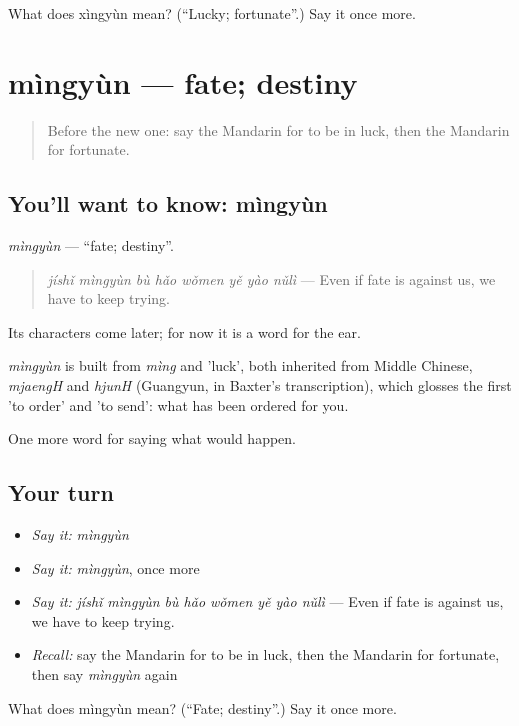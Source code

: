 \begin{tcolorbox}[breakable,colback=teal!4,colframe=teal!35!black,title={Before you move on}]
What does xìngyùn mean? (\textquotedblleft{}Lucky; fortunate\textquotedblright{}.) Say it once more.
\end{tcolorbox}
\section[mìngyùn]{mìngyùn — fate; destiny}

\label{lesson:ZH-C529-mingyun}



\begin{quote}
Before the new one: say the Mandarin for to be in luck, then the Mandarin for fortunate.
\end{quote}

\subsection*{You'll want to know: mìngyùn}
\emph{mìngyùn} — \textquotedblleft{}fate; destiny\textquotedblright{}.

\begin{quote}
\emph{jíshǐ mìngyùn bù hǎo wǒmen yě yào nǔlì} — Even if fate is against us, we have to keep trying.
\end{quote}

Its characters come later; for now it is a word for the ear.

\begin{cousinweb}
\emph{mìngyùn} is built from \emph{mìng} and  'luck', both inherited from Middle Chinese, \emph{mjaengH} and \emph{hjunH} (Guangyun, in Baxter's transcription), which glosses the first 'to order' and 'to send': what has been ordered for you.
\end{cousinweb}

\begin{grammarlens}[title={What you've built}]
One more word for saying what would happen.
\end{grammarlens}

\subsection*{Your turn}
\begin{itemize}
\raggedright
  \item \emph{Say it:} \emph{mìngyùn}
  \item \emph{Say it:} \emph{mìngyùn}, once more
  \item \emph{Say it:} \emph{jíshǐ mìngyùn bù hǎo wǒmen yě yào nǔlì} — Even if fate is against us, we have to keep trying.
  \item \emph{Recall:} say the Mandarin for to be in luck, then the Mandarin for fortunate, then say \emph{mìngyùn} again
\end{itemize}

\begin{tcolorbox}[breakable,colback=teal!4,colframe=teal!35!black,title={Before you move on}]
What does mìngyùn mean? (\textquotedblleft{}Fate; destiny\textquotedblright{}.) Say it once more.
\end{tcolorbox}
